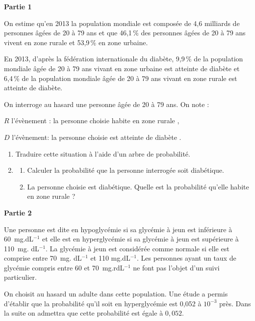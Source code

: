 \documentclass[a4paper,10pt]{article}
\begin{document}
\medskip

\textbf{Partie 1}

\medskip

On estime qu'en 2013 la population mondiale est composée de 4,6 milliards de personnes âgées de 20 à 79 ans et que 46,1\,\% des personnes âgées de 20 à 79 ans vivent en zone rurale et 53,9\,\% en zone urbaine.

En 2013, d'après la fédération internationale du diabète, 9,9\,\% de la population mondiale âgée de 20 à 79 ans vivant en zone urbaine est atteinte de diabète et 6,4\,\% de la population mondiale âgée de 20 à 79 ans vivant en zone rurale est atteinte de diabète.

On interroge au hasard une personne âgée de 20 à 79 ans. On note :

$R$ l'évènement : \og la personne choisie habite en zone rurale \fg,

$D$ l'évènement: \og la personne choisie est atteinte de diabète \fg.

\medskip

\begin{enumerate}
\item Traduire cette situation à l'aide d'un arbre de probabilité.
\item 
	\begin{enumerate}
		\item Calculer la probabilité que la personne interrogée soit diabétique.
		\item La personne choisie est diabétique. Quelle est la probabilité qu'elle habite en zone rurale ?
 	\end{enumerate}
\end{enumerate}

\bigskip

\textbf{Partie 2}

\medskip

Une personne est dite en hypoglycémie si sa glycémie à jeun est inférieure à 60~mg.dL$^{-1}$ et elle est en hyperglycémie si sa glycémie à jeun est supérieure à 110~mg. dL$^{-1}$. La glycémie à jeun est considérée comme \og normale \fg{} si elle est comprise entre 70~mg. dL$^{-1}$ et 110 mg.dL$^{-1}$. Les personnes ayant un taux de glycémie compris entre 60 et 70~mg.rdL$^{-1}$ ne font pas l'objet d'un suivi particulier.

On choisit au hasard un adulte dans cette population. Une étude a permis d'établir que la probabilité qu'il soit en hyperglycémie est 0,052 à $10^{-3}$ près. Dans la suite on admettra que cette probabilité est égale à $0,052$.
\end{document}
